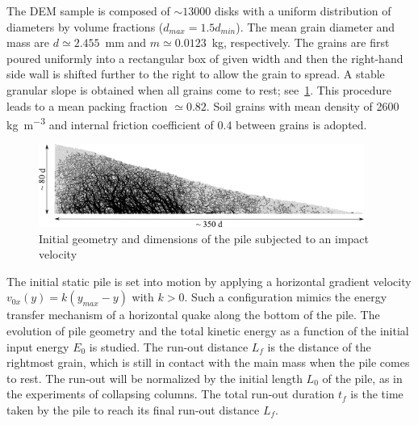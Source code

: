 The DEM sample is composed of $\sim13000$ disks with a uniform distribution of 
diameters by volume fractions ($d_{max} = 1.5 d_{min}$). The mean grain 
diameter and mass are $d\simeq 2.455 $~\si{\mm} and $m\simeq 0.0123$~\si{\kg}, 
respectively. The grains are first poured uniformly into a rectangular box of 
given width and then the right-hand side wall is shifted further to the right 
to allow the grain to spread. A stable granular slope is obtained when all 
grains come to rest; see~\cref{fig:slope_configuration}. This procedure leads 
to a mean packing fraction $\simeq 0.82$. Soil grains with mean density of 2600 
\si{\kg\per\m\cubed} and internal friction coefficient of 0.4 between 
grains is adopted.

\begin{figure}[tbhp]
\includegraphics[width=0.95\textwidth]{slope_configuration}
\caption{Initial geometry and dimensions of the pile subjected to an impact 
velocity}
\label{fig:slope_configuration}
\end{figure}


The initial static pile is set into motion by applying a horizontal
gradient velocity $v_{0x}(y) = k (y_{max} - y)$ with $k>0$. Such a 
configuration mimics the energy transfer mechanism of a horizontal quake along 
the bottom of the pile. The evolution of pile geometry and the total kinetic 
energy as a function of 
the initial input energy $E_0$ is studied. The run-out distance $L_f$ is the 
distance of the rightmost grain, which is still in contact with the main mass 
when the pile comes to rest. The run-out will be normalized by the initial 
length $L_0$ of the pile, 
as in the experiments of collapsing columns. The total run-out duration $t_f$ 
is the time taken by the pile to reach its final run-out distance $L_f$.

